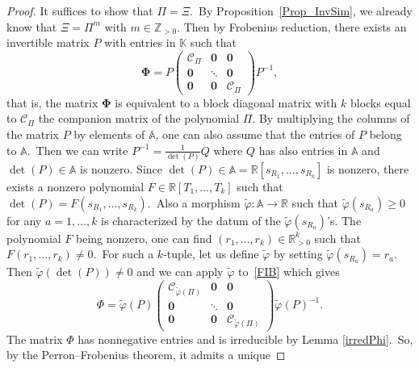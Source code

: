 \documentclass[10pt,a4paper]{amsart}
\theoremstyle{definition}
\begin{document}
\begin{proof}
It suffices to show that $\Pi=\Xi$.\ By Proposition~\ref{Prop_InvSim}, we
already know that $\Xi=\Pi^{m}$ with $m\in\mathbb{Z}_{>0}$. Then by Frobenius
reduction, there exists an invertible matrix $P$ with entries in $\mathbb{K}$
such that
\begin{equation}
\boldsymbol{\Phi}=P\left(
\begin{matrix}
\mathcal{C}_{\Pi} & \boldsymbol{0} & \boldsymbol{0}\\
\boldsymbol{0} & \ddots & \boldsymbol{0}\\
\boldsymbol{0} & \boldsymbol{0} & \mathcal{C}_{\Pi}%
\end{matrix}
\right) P^{-1}, \label{FIB}%
\end{equation}
that is, the matrix $\boldsymbol{\Phi}$ is equivalent to a block diagonal
matrix with $k$ blocks equal to $\mathcal{C}_{\Pi}$ the companion matrix of
the polynomial $\Pi$. By multiplying the columns of the matrix $P$ by elements
of $\mathbb{A}$, one can also assume that the entries of $P$ belong to
$\mathbb{A}$.\ Then we can write $P^{-1}=\frac{1}{\det(P)}Q$ where $Q$ has
also entries in $\mathbb{A}$ and $\det(P)\in\mathbb{A}$ is nonzero. Since
$\det(P)\in\mathbb{A}=\mathbb{R}[s_{R_{1}},\ldots,s_{R_{k}}]$ is nonzero,
there exists a nonzero polynomial $F\in\mathbb{R}[T_{1},\ldots,T_{k}]$ such
that $\det(P)=F(s_{R_{1}},\ldots,s_{R_{k}})$.\ Also a morphism $\widetilde
{\varphi}:\mathbb{A}\rightarrow\mathbb{R}$ such that $\widetilde{\varphi
}(s_{R_{a}})\geq0$ for any $a=1,\ldots,k$ is characterized by the datum of the
$\widetilde{\varphi}(s_{R_{a}})$'s. The polynomial $F$ being nonzero, one can
find $(r_{1},\ldots,r_{k})\in\mathbb{R}_{>0}^{k}$ such that $F(r_{1}%
,\ldots,r_{k})\neq0$.\ For such a $k$-tuple, let us define $\widetilde
{\varphi}$ by setting $\widetilde{\varphi}(s_{R_{a}})=r_{a}$. Then
$\widetilde{\varphi}(\det(P))\neq0$ and we can apply $\widetilde{\varphi}$ to~\eqref{FIB} which gives%
\[
\Phi=\widetilde{\varphi}(P)\left(
\begin{matrix}
\mathcal{C}_{\widetilde{\varphi}(\Pi)} & \boldsymbol{0} & \boldsymbol{0}\\
\boldsymbol{0} & \ddots & \boldsymbol{0}\\
\boldsymbol{0} & \boldsymbol{0} & \mathcal{C}_{\widetilde{\varphi}(\Pi)}%
\end{matrix}
\right) \widetilde{\varphi}(P)^{-1}.
\]
The matrix $\Phi$ has nonnegative entries and is irreducible by Lemma
\ref{irredPhi}.\ So, by the Perron--Frobenius theorem, it admits a unique

\end{proof}
\end{document}
